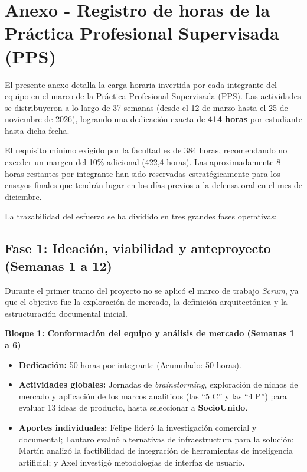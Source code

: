 \section{Anexo - Registro de horas de la Práctica Profesional Supervisada (PPS)}

El presente anexo detalla la carga horaria invertida por cada integrante del equipo en el marco de la Práctica Profesional Supervisada (PPS). Las actividades se distribuyeron a lo largo de 37 semanas (desde el 12 de marzo hasta el 25 de noviembre de 2026), logrando una dedicación exacta de \textbf{414 horas} por estudiante hasta dicha fecha. 

El requisito mínimo exigido por la facultad es de 384 horas, recomendando no exceder un margen del 10\% adicional (422,4 horas). Las aproximadamente 8 horas restantes por integrante han sido reservadas estratégicamente para los ensayos finales que tendrán lugar en los días previos a la defensa oral en el mes de diciembre.

La trazabilidad del esfuerzo se ha dividido en tres grandes fases operativas:

\subsection{Fase 1: Ideación, viabilidad y anteproyecto (Semanas 1 a 12)}

Durante el primer tramo del proyecto no se aplicó el marco de trabajo \textit{Scrum}, ya que el objetivo fue la exploración de mercado, la definición arquitectónica y la estructuración documental inicial.

\textbf{Bloque 1: Conformación del equipo y análisis de mercado (Semanas 1 a 6)}
\begin{itemize}
    \item \textbf{Dedicación:} 50 horas por integrante (Acumulado: 50 horas).
    \item \textbf{Actividades globales:} Jornadas de \textit{brainstorming}, exploración de nichos de mercado y aplicación de los marcos analíticos (las ``5 C'' y las ``4 P'') para evaluar 13 ideas de producto, hasta seleccionar a \textbf{SocioUnido}.
    \item \textbf{Aportes individuales:} Felipe lideró la investigación comercial y documental; Lautaro evaluó alternativas de infraestructura para la solución; Martín analizó la factibilidad de integración de herramientas de inteligencia artificial; y Axel investigó metodologías de interfaz de usuario.
\end{itemize}

